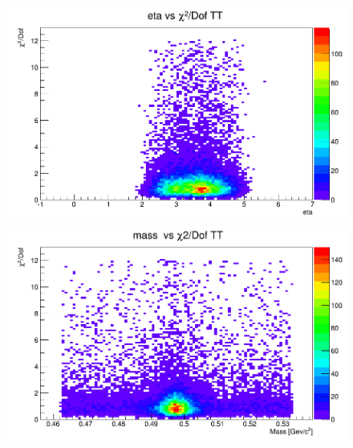 \begin{figure}[H]    
\begin{minipage}[t]{0.35\textwidth}
\includegraphics[width=\linewidth]{rozdzial6/JPsi_eta_chi2TT.png}
\end{minipage}
\hspace{\fill}
\begin{minipage}[t]{0.35\textwidth}
\includegraphics[width=\linewidth]{rozdzial6/JPsi_mass_chi2TT.png}
\end{minipage}


\end{figure}
